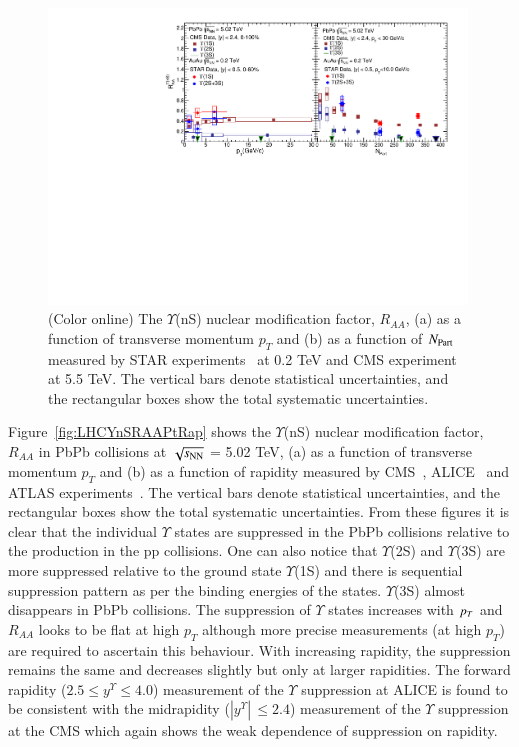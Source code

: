 \begin{figure}
  \includegraphics[width=0.99\textwidth]{Figures/ExpOverview/Fig_RHIC_LHC_YnSRAA.pdf}
  \caption{(Color online) The $\Upsilon$(nS) nuclear modification factor, $R_{AA}$, (a) as a function of transverse momentum $p_{T}$
    and (b) as a function of $N_{\rm Part}$ measured by STAR experiments~\cite{Wang:2019vau} at 0.2 TeV and CMS experiment~\cite{CMS:2018zza} at 5.5 TeV.
    The vertical bars denote statistical uncertainties, and the rectangular boxes show the total systematic uncertainties.
  }
  \label{fig:RHICYnSRAANPart}
\end{figure}


Figure~\ref{fig:LHCYnSRAAPtRap} shows the $\Upsilon$(nS) nuclear modification factor, $R_{AA}$
in PbPb collisions at $\sqrt{s_{\rm NN}}$ = 5.02 TeV, (a) as a function of transverse momentum $p_{T}$
and (b) as a function of rapidity measured by CMS~\cite{CMS:2018zza}, ALICE~\cite{ALICE:2020wwx}
and ATLAS experiments~\cite{ALICE:2020wwx}.
 The vertical bars denote statistical uncertainties, and the rectangular boxes
show the total systematic uncertainties. From these figures it is clear 
that the individual $\Upsilon$ states are suppressed in
the PbPb collisions relative to the production in the pp collisions.
One can also notice that $\Upsilon$(2S) and $\Upsilon$(3S) are 
more suppressed relative to the ground state $\Upsilon$(1S) and there is sequential
suppression pattern as per the binding energies of the states.
$\Upsilon$(3S) almost disappears in PbPb collisions. 
The suppression of $\Upsilon$ states increases with $p_{T}$ and $R_{AA}$ looks
to be flat at high $p_T$
although more precise measurements (at high $p_T$) are required to ascertain
this behaviour. 
With increasing rapidity, the suppression remains the same and decreases
slightly but only at larger rapidities.
The forward rapidity ($2.5 \leq y^{\Upsilon} \leq 4.0$) measurement of the $\Upsilon$ suppression at 
ALICE is found to be consistent with the midrapidity ($|y^{\Upsilon}|\,\leq 2.4$)
measurement of the $\Upsilon$ suppression at the CMS which again shows the weak dependence
of suppression on rapidity.



